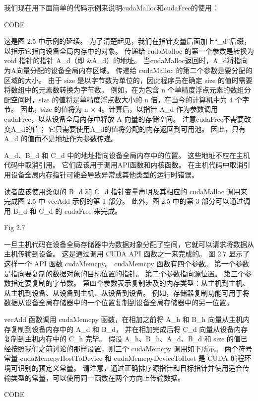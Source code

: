 我们现在用下面简单的代码示例来说明cudaMalloc和cudaFree的使用：

{\color{red} CODE}

这是图 2.5 中示例的延续。 为了清楚起见，我们在指针变量后面加上“\_d”后缀，以指示它指向设备全局内存中的对象。 
传递给 cudaMalloc 的第一个参数是转换为 void 指针的指针 A\_d（即 \&A\_d）的地址。 
当cudaMalloc返回时，A\_d将指向为A向量分配的设备全局内存区域。 传递给 cudaMalloc 的第二个参数是要分配的区域的大小。 
由于 size 是以字节数为单位的，因此程序员在确定 size 的值时需要将数组中的元素数转换为字节数。 
例如，在为包含 n 个单精度浮点元素的数组分配空间时，size 的值将是单精度浮点数大小的 n 倍，在当今的计算机中为 4 个字节。 
因此，size 的值将为 n × 4。计算后，以指针 A\_d 作为参数调用 cudaFree，以从设备全局内存中释放 A 向量的存储空间。 
注意cudaFree不需要改变A\_d的值； 它只需要使用A\_d的值将分配的内存返回到可用池。 
因此，只有 A\_d 的值而不是地址作为参数传递。

A\_d、B\_d 和 C\_d 中的地址指向设备全局内存中的位置。 这些地址不应在主机代码中取消引用。 
它们应该用于调用API函数和内核函数。 在主机代码中取消引用设备全局内存指针可能会导致异常或其他类型的运行时错误。

读者应该使用类似的 B\_d 和 C\_d 指针变量声明及其相应的 cudaMalloc 调用来完成图 2.5 中 vecAdd 示例的第 1 部分。 
此外，图 2.5 中的第 3 部分可以通过调用 B\_d 和 C\_d 的 cudaFree 来完成。

{\color{red} Fig 2.7}

一旦主机代码在设备全局存储器中为数据对象分配了空间，它就可以请求将数据从主机传输到设备。 
这是通过调用 CUDA API 函数之一来完成的。 图 2.7 显示了这样一个 API 函数 cudaMemcpy。 
cudaMemcpy 函数有四个参数。 第一个参数是指向要复制的数据对象的目标位置的指针。 第二个参数指向源位置。 
第三个参数指定要复制的字节数。 第四个参数表示复制涉及的内存类型：从主机到主机、从主机到设备、从设备到主机、从设备到设备。 
例如，存储器复制功能可用于将数据从设备全局存储器中的一个位置复制到设备全局存储器中的另一位置。

vecAdd 函数调用 cudaMemcpy 函数，在相加之前将 A\_h 和 B\_h 向量从主机内存复制到设备内存中的 A\_d 和 B\_d，
并在相加完成后将 C\_d 向量从设备内存复制到主机内存中的 C\_h 完毕。 
假设 A\_h、B\_h、A\_d、B\_d 和 size 的值已经按照我们之前讨论的那样设置，则三个 cudaMemcpy 调用如下所示。 
两个符号常量 cudaMemcpyHostToDevice 和 cudaMemcpyDeviceToHost 是 CUDA 编程环境可识别的预定义常量。 
请注意，通过正确排序源指针和目标指针并使用适合传输类型的常量，可以使用同一函数在两个方向上传输数据。

{\color{red} CODE}

